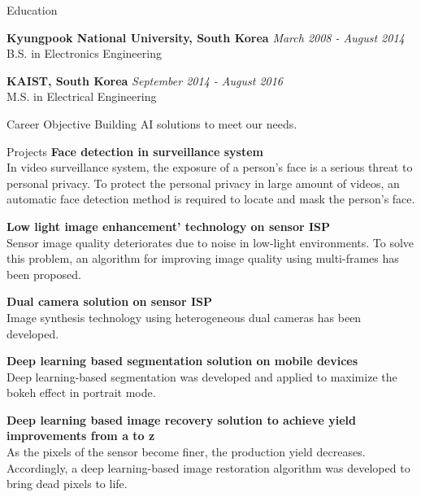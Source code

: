 \documentclass{resume}
\begin{document}
\begin{rSection}{Education}


{\bf Kyungpook National University, South Korea} \hfill {\em March 2008 - August 2014} 
\\ B.S. in Electronics Engineering\hfill 

{\bf KAIST, South Korea} \hfill {\em September 2014 - August 2016} 
\\ M.S. in Electrical Engineering\hfill

\end{rSection}

\begin{rSection}{Career Objective}
 Building AI solutions to meet our needs.
\end{rSection}

\begin{rSection}{Projects}
{\bf Face detection in surveillance system }
\\ In video surveillance system, the exposure of a person’s face is a serious threat to personal privacy.
To protect the personal privacy in large amount of videos, an automatic face detection method is required to locate and mask the person’s face.

{\bf Low light image enhancement' technology on sensor ISP}
\\ Sensor image quality deteriorates due to noise in low-light environments. To solve this problem, an algorithm for improving image quality using multi-frames has been proposed.

{\bf Dual camera solution on sensor ISP}
\\ Image synthesis technology using heterogeneous dual cameras has been developed.

{\bf Deep learning based segmentation solution on mobile devices}
\\ Deep learning-based segmentation was developed and applied to maximize the bokeh effect in portrait mode.

{\bf Deep learning based image recovery solution to achieve yield improvements from a to z}
\\ As the pixels of the sensor become finer, the production yield decreases. Accordingly, a deep learning-based image restoration algorithm was developed to bring dead pixels to life.

\end{rSection}
\end{document}
